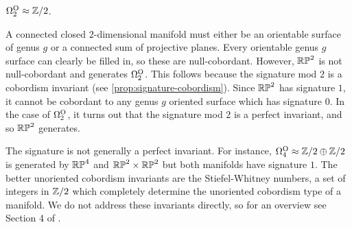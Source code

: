 \begin{example}
	$\Omega_2^{\mathrm{O}}\approx \mathbb{Z}/2$.

	A connected closed $2$-dimensional manifold must either be an orientable surface of genus $g$ or a connected sum of projective planes. Every orientable genus $g$ surface can clearly be filled in, so these are null-cobordant. However, $\mathbb{RP}^2$ is not null-cobordant and generates $\Omega_2^{\mathrm{O}}$. This follows because the signature mod $2$ is a cobordism invariant (see \cref{prop:signature-cobordism}). Since $\mathbb{RP}^2$ has signature $1$, it cannot be cobordant to any genus $g$ oriented surface which has signature $0$. 
	In the case of $\Omega_2^{\mathrm{O}}$, it turns out that the signature mod $2$ is a perfect invariant, and so $\mathbb{RP}^2$ generates.
\end{example}

The signature is not generally a perfect invariant. For instance, $\Omega_4^{\mathrm{O}}\approx \mathbb{Z}/2\oplus \mathbb{Z}/2$ is generated by $\mathbb{RP}^4$ and $\mathbb{RP}^2\times \mathbb{RP}^2$ but both manifolds have signature $1$. The better unoriented cobordism invariants are the Stiefel-Whitney numbers, a set of integers in $\mathbb{Z}/2$ which completely determine the unoriented cobordism type of a manifold. We do not address these invariants directly, so for an overview see Section 4 of \cite{milnorstasheff1974}.

